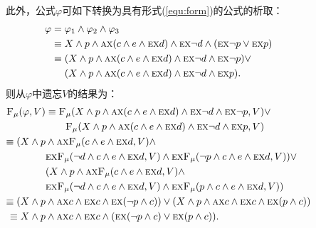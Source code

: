 \documentclass[9pt, CJK]{beamer}
\begin{document}
\begin{frame}
{\begin{example}
\begin{columns}
	此外，公式$\varphi$可如下转换为具有形式(\ref{equ:form})的公式的析取：
	\begin{align*}
		\varphi & = \varphi_1 \wedge \varphi_2 \wedge \varphi_3\\
		& \equiv X \wedge p \wedge \textsc{a}\textsc{x}(c \wedge e \wedge \textsc{e}\textsc{x} d) \wedge \textsc{e}\textsc{x} \neg d \wedge (\textsc{e}\textsc{x} \neg p \vee \textsc{e}\textsc{x} p)\\
		& \equiv (X \wedge p \wedge \textsc{a}\textsc{x}(c \wedge e \wedge \textsc{e}\textsc{x} d) \wedge \textsc{e}\textsc{x} \neg d \wedge \textsc{e}\textsc{x} \neg p) \vee\\
		& \quad\ (X \wedge p \wedge \textsc{a}\textsc{x}(c \wedge e \wedge \textsc{e}\textsc{x} d) \wedge \textsc{e}\textsc{x} \neg d \wedge \textsc{e}\textsc{x}  p).
	\end{align*}
		则从$\varphi$中遗忘$V$的结果为：
		\begin{align*}
			{\textsc{F}_{\textsc{$\mu$}}}(\varphi,V) & \equiv {\textsc{F}_{\textsc{$\mu$}}}(X \wedge p \wedge \textsc{a}\textsc{x}(c \wedge e \wedge \textsc{e}\textsc{x} d) \wedge \textsc{e}\textsc{x} \neg d \wedge \textsc{e}\textsc{x} \neg p, V) \vee \\
			& \qquad {\textsc{F}_{\textsc{$\mu$}}}(X \wedge p \wedge \textsc{a}\textsc{x}(c \wedge e \wedge \textsc{e}\textsc{x} d) \wedge \textsc{e}\textsc{x} \neg d \wedge \textsc{e}\textsc{x}  p,V) \\
			 \equiv (X \wedge p & \wedge \textsc{a}\textsc{x}{\textsc{F}_{\textsc{$\mu$}}}(c \wedge e \wedge \textsc{e}\textsc{x} d, V) \wedge\\
			&  \textsc{e}\textsc{x}{\textsc{F}_{\textsc{$\mu$}}}(\neg d \wedge c \wedge e \wedge \textsc{e}\textsc{x} d, V) \wedge  \textsc{e}\textsc{x}{\textsc{F}_{\textsc{$\mu$}}}(\neg p \wedge c \wedge e \wedge \textsc{e}\textsc{x} d, V) )\vee \\
			&  (X \wedge p \wedge \textsc{a}\textsc{x}{\textsc{F}_{\textsc{$\mu$}}}(c \wedge e \wedge \textsc{e}\textsc{x} d, V) \wedge\\
			&  \textsc{e}\textsc{x}{\textsc{F}_{\textsc{$\mu$}}}(\neg d \wedge c \wedge e \wedge \textsc{e}\textsc{x} d, V) \wedge  \textsc{e}\textsc{x}{\textsc{F}_{\textsc{$\mu$}}}( p \wedge c \wedge e \wedge \textsc{e}\textsc{x} d, V)) \\
		 \equiv 	(X \wedge p & \wedge \textsc{a}\textsc{x} c \wedge \textsc{e}\textsc{x} c \wedge \textsc{e}\textsc{x} (\neg p \wedge c)) \vee 
			(X \wedge p \wedge \textsc{a}\textsc{x} c \wedge \textsc{e}\textsc{x} c \wedge \textsc{e}\textsc{x} (p \wedge c)) \\
			 \equiv  X \wedge p & \wedge \textsc{a}\textsc{x} c \wedge \textsc{e}\textsc{x} c \wedge (\textsc{e}\textsc{x} (\neg p \wedge c) \vee \textsc{e}\textsc{x} (p \wedge c)).
		\end{align*}
	\end{columns}
	\end{example}}
\end{frame}
\end{document}
